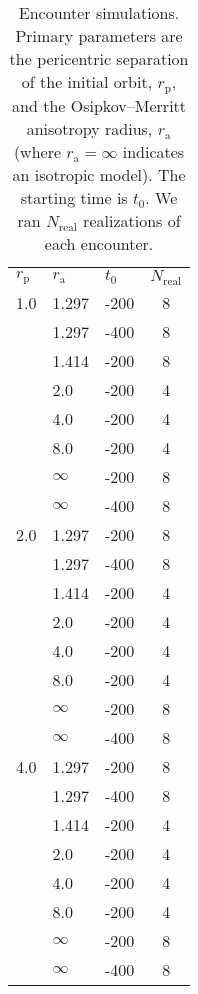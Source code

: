 \documentclass[fleqn,usenatbib]{mnras}
\begin{document}
\begin{table}
    \centering
    \caption{Encounter simulations.  Primary parameters are the pericentric separation of the initial orbit, $r_\mathrm{p}$, and the Osipkov--Merritt anisotropy radius, $r_\mathrm{a}$ (where $r_\mathrm{a} = \infty$ indicates an isotropic model). The starting time is $t_{0}$. We ran $N_\mathrm{real}$ realizations of each encounter.}
    \begin{tabular}{l l l c}
        \noalign{\bigskip} \hline \noalign{\smallskip}
        $r_\mathrm{p}$
        &
        $r_\mathrm{a}$
        &
        $t_{0}$
        &
        $N_\mathrm{real}$ \\
        \noalign{\smallskip}
        \hline
        \noalign{\smallskip}
        1.0 & 1.297    & -200 & 8 \\
            & 1.297    & -400 & 8 \\
            & 1.414    & -200 & 8 \\
            & 2.0      & -200 & 4 \\
            & 4.0      & -200 & 4 \\
            & 8.0      & -200 & 4 \\
            & $\infty$ & -200 & 8 \\
            & $\infty$ & -400 & 8 \\
        \noalign{\medskip}
        2.0 & 1.297    & -200 & 8 \\
            & 1.297 & -400 & 8 \\
            & 1.414    & -200 & 4 \\
            & 2.0      & -200 & 4 \\
            & 4.0      & -200 & 4 \\
            & 8.0      & -200 & 4 \\
            & $\infty$ & -200 & 8 \\
            & $\infty$ & -400 & 8 \\
        \noalign{\medskip}
        4.0 & 1.297    & -200 & 8 \\
            & 1.297    & -400 & 8 \\
            & 1.414    & -200 & 4 \\
            & 2.0      & -200 & 4 \\
            & 4.0      & -200 & 4 \\
            & 8.0      & -200 & 4 \\
            & $\infty$ & -200 & 8 \\
            & $\infty$ & -400 & 8 \\
            \hline
    \end{tabular}
    \label{tab:simulations}
\end{table}
\end{document}
